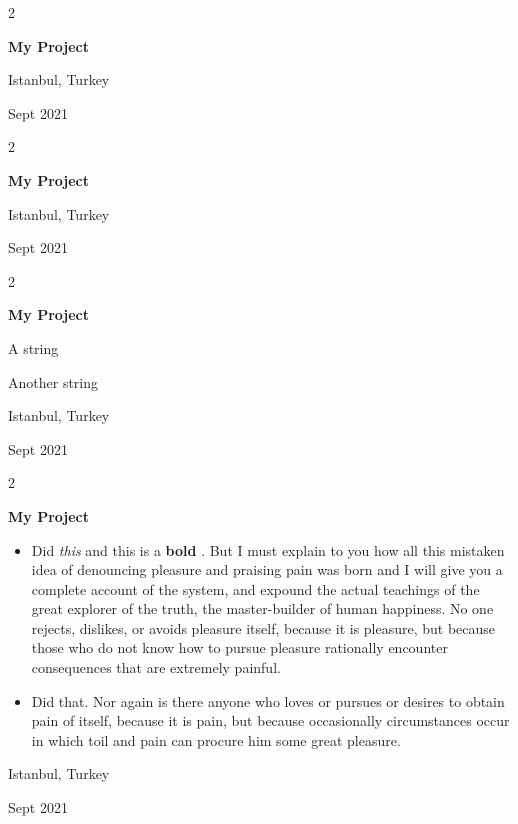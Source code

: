 \documentclass[10pt, letterpaper]{article}
\newenvironment{summary}{
    \begin{description}[
        topsep=0.10 cm,
        parsep=0.10 cm,
        partopsep=0pt,
        itemsep=0pt,
        leftmargin=0.4 cm + 10pt
    ]
}{
    \end{description}
} %
\newenvironment{highlights}{
    \begin{itemize}[
        topsep=0.10 cm,
        parsep=0.10 cm,
        partopsep=0pt,
        itemsep=0pt,
        leftmargin=0.4 cm + 10pt
    ]
}{
    \end{itemize}
} %
\newenvironment{twocolentry}[2][]{
    \onecolentry
    \def\secondColumn{#2}
    \setcolumnwidth{\fill, 4.5 cm}
    \begin{paracol}{2}
}{
    \switchcolumn \raggedleft \secondColumn
    \end{paracol}
    \endonecolentry
} %
\let\hrefWithoutArrow\href
\renewcommand{\href}[2]{\hrefWithoutArrow{#1}{\ifthenelse{\equal{#2}{}}{ }{#2 }\raisebox{.15ex}{\footnotesize \faExternalLink*}}}
\begin{document}
        \vspace{0.2 cm}

        \begin{twocolentry}{
            Istanbul, Turkey

        Sept 2021
        }
            \textbf{My Project}
        \end{twocolentry}


        \vspace{0.2 cm}

        \begin{twocolentry}{
            Istanbul, Turkey

        Sept 2021
        }
            \textbf{My Project}
        \end{twocolentry}


        \vspace{0.2 cm}

        \begin{twocolentry}{
            Istanbul, Turkey

        Sept 2021
        }
            \textbf{My Project}
            \begin{summary}
                \item A string
                \item Another string
            \end{summary}
        \end{twocolentry}


        \vspace{0.2 cm}

        \begin{twocolentry}{
            Istanbul, Turkey

        Sept 2021
        }
            \textbf{My Project}
            \begin{highlights}
                \item Did \textit{this} and this is a \textbf{bold} \href{https://example.com}{link}. But I must explain to you how all this mistaken idea of denouncing pleasure and praising pain was born and I will give you a complete account of the system, and expound the actual teachings of the great explorer of the truth, the master-builder of human happiness. No one rejects, dislikes, or avoids pleasure itself, because it is pleasure, but because those who do not know how to pursue pleasure rationally encounter consequences that are extremely painful.
                \item Did that. Nor again is there anyone who loves or pursues or desires to obtain pain of itself, because it is pain, but because occasionally circumstances occur in which toil and pain can procure him some great pleasure.
            \end{highlights}
        \end{twocolentry}
\end{document}
